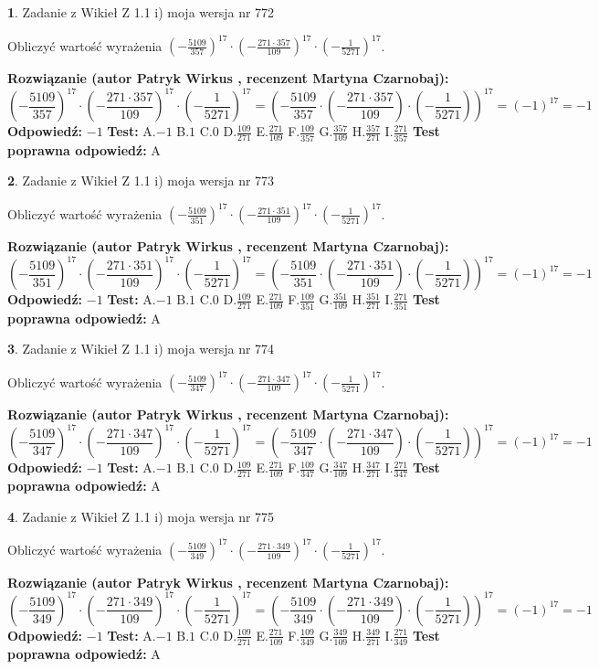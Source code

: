 \documentclass[12pt, a4paper]{article}
\theoremstyle{definition} %
\newtheorem{zad}{}
\newcommand{\zadStart}[1]{\begin{zad}#1\newline}
\newcommand{\zadStop}{\end{zad}}
\newcommand{\rozwStart}[2]{\noindent \textbf{Rozwiązanie (autor #1 , recenzent #2): }\newline}
\newcommand{\rozwStop}{\newline}
\newcommand{\odpStart}{\noindent \textbf{Odpowiedź:}\newline}
\newcommand{\odpStop}{\newline}
\newcommand{\testStart}{\noindent \textbf{Test:}\newline}
\newcommand{\testStop}{\newline}
\newcommand{\kluczStart}{\noindent \textbf{Test poprawna odpowiedź:}\newline}
\newcommand{\kluczStop}{\newline}
\begin{document}
\zadStart{Zadanie z Wikieł Z 1.1 i) moja wersja nr 772}

Obliczyć wartość wyrażenia $(-\frac{5109}{357})^{17} \cdot (-\frac{271 \cdot 357}{109})^{17} \cdot (-\frac{1}{5271})^{17}$.
\zadStop
\rozwStart{Patryk Wirkus}{Martyna Czarnobaj}
$$(-\frac{5109}{357})^{17} \cdot (-\frac{271 \cdot 357}{109})^{17} \cdot (-\frac{1}{5271})^{17} = (-\frac{5109}{357} \cdot (-\frac{271 \cdot 357}{109}) \cdot (-\frac{1}{5271}))^{17} = (-1)^{17} = -1$$
\rozwStop
\odpStart
$-1$
\odpStop
\testStart
A.$-1$ B.$1$ C.$0$ D.$\frac{109}{271}$ E.$\frac{271}{109}$
F.$\frac{109}{357}$ G.$\frac{357}{109}$
H.$\frac{357}{271}$
I.$\frac{271}{357}$
\testStop
\kluczStart
A
\kluczStop



\zadStart{Zadanie z Wikieł Z 1.1 i) moja wersja nr 773}

Obliczyć wartość wyrażenia $(-\frac{5109}{351})^{17} \cdot (-\frac{271 \cdot 351}{109})^{17} \cdot (-\frac{1}{5271})^{17}$.
\zadStop
\rozwStart{Patryk Wirkus}{Martyna Czarnobaj}
$$(-\frac{5109}{351})^{17} \cdot (-\frac{271 \cdot 351}{109})^{17} \cdot (-\frac{1}{5271})^{17} = (-\frac{5109}{351} \cdot (-\frac{271 \cdot 351}{109}) \cdot (-\frac{1}{5271}))^{17} = (-1)^{17} = -1$$
\rozwStop
\odpStart
$-1$
\odpStop
\testStart
A.$-1$ B.$1$ C.$0$ D.$\frac{109}{271}$ E.$\frac{271}{109}$
F.$\frac{109}{351}$ G.$\frac{351}{109}$
H.$\frac{351}{271}$
I.$\frac{271}{351}$
\testStop
\kluczStart
A
\kluczStop



\zadStart{Zadanie z Wikieł Z 1.1 i) moja wersja nr 774}

Obliczyć wartość wyrażenia $(-\frac{5109}{347})^{17} \cdot (-\frac{271 \cdot 347}{109})^{17} \cdot (-\frac{1}{5271})^{17}$.
\zadStop
\rozwStart{Patryk Wirkus}{Martyna Czarnobaj}
$$(-\frac{5109}{347})^{17} \cdot (-\frac{271 \cdot 347}{109})^{17} \cdot (-\frac{1}{5271})^{17} = (-\frac{5109}{347} \cdot (-\frac{271 \cdot 347}{109}) \cdot (-\frac{1}{5271}))^{17} = (-1)^{17} = -1$$
\rozwStop
\odpStart
$-1$
\odpStop
\testStart
A.$-1$ B.$1$ C.$0$ D.$\frac{109}{271}$ E.$\frac{271}{109}$
F.$\frac{109}{347}$ G.$\frac{347}{109}$
H.$\frac{347}{271}$
I.$\frac{271}{347}$
\testStop
\kluczStart
A
\kluczStop



\zadStart{Zadanie z Wikieł Z 1.1 i) moja wersja nr 775}

Obliczyć wartość wyrażenia $(-\frac{5109}{349})^{17} \cdot (-\frac{271 \cdot 349}{109})^{17} \cdot (-\frac{1}{5271})^{17}$.
\zadStop
\rozwStart{Patryk Wirkus}{Martyna Czarnobaj}
$$(-\frac{5109}{349})^{17} \cdot (-\frac{271 \cdot 349}{109})^{17} \cdot (-\frac{1}{5271})^{17} = (-\frac{5109}{349} \cdot (-\frac{271 \cdot 349}{109}) \cdot (-\frac{1}{5271}))^{17} = (-1)^{17} = -1$$
\rozwStop
\odpStart
$-1$
\odpStop
\testStart
A.$-1$ B.$1$ C.$0$ D.$\frac{109}{271}$ E.$\frac{271}{109}$
F.$\frac{109}{349}$ G.$\frac{349}{109}$
H.$\frac{349}{271}$
I.$\frac{271}{349}$
\testStop
\kluczStart
A
\kluczStop
\end{document}
